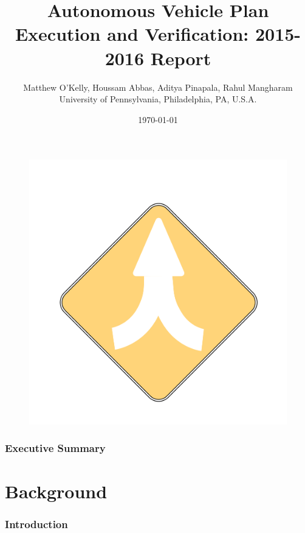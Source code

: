 \documentclass[11pt]{article}              %
\title{Autonomous Vehicle Plan Execution and Verification: 2015-2016 Report}
\author{Matthew O'Kelly, Houssam Abbas, Aditya Pinapala, Rahul Mangharam \\ \large University of Pennsylvania,
	Philadelphia, PA, U.S.A.\\}
\date{\today}
\begin{document}
                      

\begin{figure}
	\centering
	\includegraphics[scale=0.25]{figures/apexlogo}
\end{figure}
\maketitle                            
\pagebreak


\section*{Executive Summary}

\pagebreak
\tableofcontents                        
\pagebreak


\part{Background}
\section{Introduction}
 
\pagebreak
\end{document}
